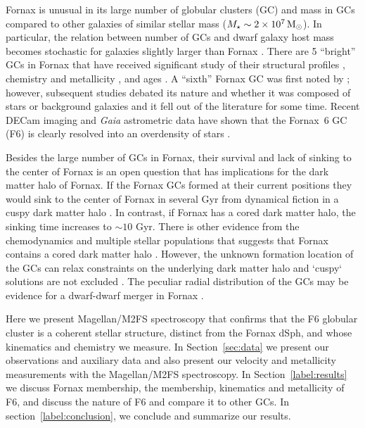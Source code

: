 \documentclass[twocolumn]{aastex63}
\begin{document}
Fornax is unusual in its large number of globular clusters (GC) and mass in GCs compared to other galaxies of similar stellar mass ($M_{\star} \sim 2\times 10^{7} \mathrm{\,M_\odot}$)\citep{Huang2021MNRAS.500..986H}.
In particular, the relation between number of GCs and dwarf galaxy host mass becomes stochastic for galaxies slightly larger than Fornax \citep[e.g.,][]{Forbes2018MNRAS.481.5592F}. 
There are 5 ``bright'' GCs in Fornax that have received significant study of their structural profiles \citep{Mackey2003MNRAS.340..175M}, chemistry and metallicity \citep{Strader2003AJ....125.1291S, Hendricks2016A&A...585A..86H}, and ages \citep{deBoer2016A&A...590A..35D}.
A ``sixth'' Fornax GC was first noted by \citet{Shapley1939PNAS...25..565S}; however,  subsequent studies debated its nature and  whether it was composed of stars or background galaxies  \citep{Verner1981AJ.....86..357V, Demers1994AJ....108.1648D, Stetson1998PASP..110..533S} and it fell out of the literature for some time.
Recent DECam imaging and {\it Gaia} astrometric data have shown that the Fornax~6 GC (F6) is clearly resolved into an overdensity of stars \citep{Wang2019ApJ...875L..13W}.

Besides the large number of GCs in Fornax, their survival and lack of sinking to the center of Fornax is an open question that has implications for the dark matter halo of Fornax.
If the Fornax GCs formed at their current positions they would sink to the center of Fornax in several Gyr from dynamical fiction in a cuspy dark matter halo \citep{Goerdt2006MNRAS.368.1073G}.
In contrast, if Fornax has a cored dark matter halo, the sinking time increases to $\sim10$ Gyr. 
There is other evidence from the chemodynamics and multiple stellar populations that  suggests that Fornax contains a cored dark matter halo \citep{Walker2011ApJ...742...20W, Amorisco2013MNRAS.429L..89A}.
However, the unknown formation location of the GCs can relax constraints on the underlying dark matter halo and `cuspy` solutions are not excluded \citep{Shao2020arXiv201208058S}.
The peculiar radial distribution of the GCs may be evidence for a dwarf-dwarf merger in Fornax \citep{Leung2020MNRAS.493..320L}.

Here we present Magellan/M2FS spectroscopy that confirms that the F6 globular cluster  is a coherent stellar structure, distinct from the Fornax dSph, and whose kinematics and chemistry we measure.
In Section~\ref{sec:data} we present our observations and auxiliary data and also present our velocity and metallicity measurements with the Magellan/M2FS spectroscopy.
In Section~\ref{label:results} we discuss Fornax membership, the  membership, kinematics and metallicity of F6, and discuss the nature of F6 and compare it to other GCs. In section~\ref{label:conclusion}, we conclude and summarize our results.
\end{document}
